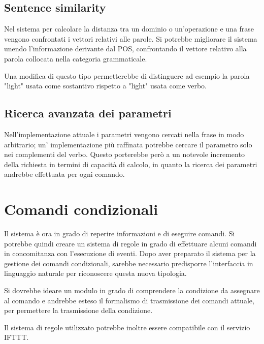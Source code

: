 \documentclass[twoside]{supsistudent}
\begin{document}
\subsection{Sentence similarity}
Nel sistema per calcolare la distanza tra un dominio o un'operazione e una frase vengono confrontati i vettori relativi alle parole. Si potrebbe migliorare il sistema unendo l'informazione derivante dal POS, confrontando il vettore relativo alla parola collocata nella categoria grammaticale.

Una modifica di questo tipo permetterebbe di distinguere ad esempio la parola "light" usata come sostantivo rispetto a "light" usata come verbo.
\subsection{Ricerca avanzata dei parametri}
Nell'implementazione attuale i parametri vengono cercati nella frase in modo arbitrario; un' implementazione più raffinata potrebbe cercare il parametro solo nei complementi del verbo. Questo porterebbe però a un notevole incremento della richiesta in termini di capacità di calcolo, in quanto la ricerca dei parametri andrebbe effettuata per ogni comando.

\section{Comandi condizionali}
Il sistema è ora in grado di reperire informazioni e di eseguire comandi. Si potrebbe quindi creare un sistema di regole in grado di effettuare alcuni comandi in concomitanza con l'esecuzione di eventi.
Dopo aver preparato il sistema per la gestione dei comandi condizionali, sarebbe necessario predisporre l'interfaccia in linguaggio naturale per riconoscere questa nuova tipologia.

Si dovrebbe ideare un modulo in grado di comprendere la condizione da assegnare al comando e andrebbe esteso il formalismo di trasmissione dei comandi attuale, per permettere la trasmissione della condizione.

Il sistema di regole utilizzato potrebbe inoltre essere compatibile con il servizio IFTTT.\cite{ifttt}
\end{document}
